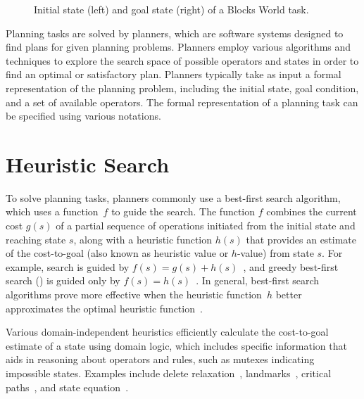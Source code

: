 \documentclass[ppgc,diss,english]{iiufrgs}
\begin{document}
\begin{figure}[ht]
\caption{Initial state (left) and goal state (right) of a Blocks World task.}
\vspace{\baselineskip}
\centering
{}
\label{fig:intro-blocks}
\end{figure}

Planning tasks are solved by planners, which are software systems designed to find plans for given planning problems. Planners employ various algorithms and techniques to explore the search space of possible operators and states in order to find an optimal or satisfactory plan. Planners typically take as input a formal representation of the planning problem, including the initial state, goal condition, and a set of available operators. The formal representation of a planning task can be specified using various notations.

\section{Heuristic Search}
\label{sec:intro-heuristic-search}
To solve planning tasks, planners commonly use a best-first search algorithm, which uses a function~$f$ to guide the search. The function $f$ combines the current cost $g(s)$ of a partial sequence of operations initiated from the initial state and reaching state $s$, along with a heuristic function $h(s)$ that provides an estimate of the cost-to-goal (also known as heuristic value or $h$-value) from state $s$. For example, \astar search is guided by $f(s)=g(s)+h(s)$~\cite{hart-et-al-ieeessc1968}, and greedy best-first search (\gbfs) is guided only by $f(s)=h(s)$~\cite{doran-michie-rsl1966}. In general, best-first search algorithms prove more effective when the heuristic function~$h$ better approximates the optimal heuristic function~\hstar.

Various domain-independent heuristics efficiently calculate the cost-to-goal estimate of a state using domain logic, which includes specific information that aids in reasoning about operators and rules, such as mutexes indicating impossible states. Examples include delete relaxation~\cite{Hoffmann.Nebel/2001}, landmarks~\cite{hoffmann-et-al-jair2004,Karpas.Domshlak/2009}, critical paths~\cite{haslum-geffner-aips2000}, and state equation~\cite{bonet-ijcai2013}.
\end{document}
